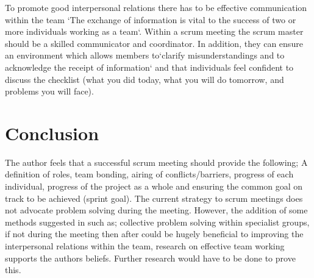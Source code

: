\documentclass{scrartcl}
\begin{document}
To promote good interpersonal relations there has to be effective communication within the team `The exchange of information is vital to the success of two or more individuals working as a team`\cite [p. 559]{fletcher2006effects}. Within a scrum meeting the scrum master should be a skilled communicator and coordinator. In addition, they can ensure an environment which allows members to`clarify misunderstandings and to acknowledge the receipt of information`\cite [p. 559]{fletcher2006effects} and that individuals feel confident to discuss the checklist (what you did today, what you will do tomorrow, and problems you will face). 


\section{Conclusion}
The author feels that a successful scrum meeting should provide the following; A definition of roles, team bonding, airing of conflicts/barriers, progress of each individual, progress of the project as a whole and ensuring the common goal on track to be achieved (sprint goal).  The current strategy to scrum meetings does not advocate problem solving during the meeting. However, the addition of some methods suggested in \cite{LeadershipLesson} such as; collective problem solving within specialist groups, if not during the meeting then after could be hugely beneficial to improving the interpersonal relations within the team, research on effective team working supports the authors beliefs. Further research would have to be done to prove this.



\end{document}
